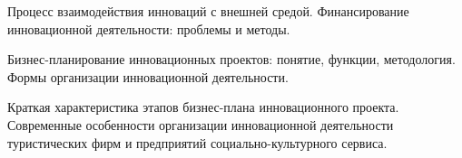 \documentclass[
	14pt,
	a4paper,
	]
	{scrartcl}
\begin{document}
\newpage


\shapk
{}
\setcounter{zad}{0}

\vfill
\z Процесс взаимодействия инноваций с внешней средой.
 \vfill
\z Финансирование инновационной деятельности: проблемы и методы.
 \vfill

\vfill

\newpage


\shapk
{}
\setcounter{zad}{0}

\vfill
\z Бизнес-планирование инновационных проектов: понятие, функции, методология.
 \vfill
\z Формы организации инновационной деятельности.
 \vfill

\vfill

\newpage


\shapk
{}
\setcounter{zad}{0}

\vfill
\z Краткая характеристика этапов бизнес-плана инновационного проекта.
 \vfill
\z Современные особенности организации инновационной деятельности туристических фирм и предприятий социально-культурного сервиса.
 \vfill

\vfill

\newpage
\end{document}
